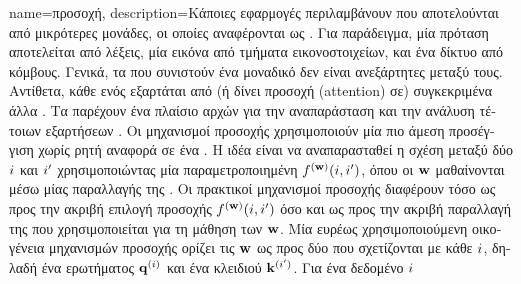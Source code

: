 {name={\foreignlanguage{greek}{προσοχή}}, 
	description={\foreignlanguage{greek}{Κάποιες εφαρμογές}  
		\foreignlanguage{greek}{περιλαμβάνουν}  \foreignlanguage{greek}{που αποτελούνται από μικρότερες
		μονάδες, οι οποίες αναφέρονται ως} . \foreignlanguage{greek}{Για παράδειγμα, μία πρόταση 
		αποτελείται από λέξεις, μία εικόνα από τμήματα εικονοστοιχείων, και ένα δίκτυο από κόμβους. Γενικά,
		τα}  \foreignlanguage{greek}{που συνιστούν ένα μοναδικό}  
		\foreignlanguage{greek}{δεν είναι ανεξάρτητες μεταξύ τους. Αντίθετα, κάθε}  
		\foreignlanguage{greek}{ενός}  \foreignlanguage{greek}{εξαρτάται από (ή δίνει προσοχή} 
		(attention) \foreignlanguage{greek}{σε) συγκεκριμένα άλλα} .
		\foreignlanguage{greek}{Τα}  \foreignlanguage{greek}{παρέχουν ένα πλαίσιο αρχών για την 
		αναπαράσταση και την ανάλυση τέτοιων εξαρτήσεων} \cite{Blei2003}. \foreignlanguage{greek}{Οι μηχανισμοί προσοχής 
		χρησιμοποι\-ούν μία πιο άμεση προσέγγιση χωρίς ρητή αναφορά σε ένα} . 
		\foreignlanguage{greek}{Η ιδέα είναι να αναπαρασταθεί η σχέση μεταξύ δύο}  $i$ 
		\foreignlanguage{greek}{και} $i'$ \foreignlanguage{greek}{χρησιμοποιώντας μία παραμετροποιημένη} 
		 $f^{({\bf w})}(i,i')$, \foreignlanguage{greek}{όπου οι}  
		${\bf w}$ \foreignlanguage{greek}{μαθαίνονται μέσω μίας 
		παραλλαγής της} . \foreignlanguage{greek}{Οι πρακτικοί μηχανισμοί προσοχής διαφέρουν τόσο ως προς
		την ακριβή επιλογή}  \foreignlanguage{greek}{προσοχής $f^{({\bf w})}(i,i')$ όσο και 
		ως προς την ακριβή παραλλαγή της}  \foreignlanguage{greek}{που χρησιμοποιείται για τη μάθηση των} 
		 ${\bf w}$. \foreignlanguage{greek}{Μία ευρέως χρησιμοποιούμενη οικογένεια μηχανισμών προσοχής
		ορίζει τις}  ${\bf w}$ \foreignlanguage{greek}{ως προς δύο}  
		\foreignlanguage{greek}{που σχετίζονται με κάθε}  $i$, \foreignlanguage{greek}{δηλαδή
		ένα}  \foreignlanguage{greek}{ερωτήματος ${\bf q}^{(i)}$ και ένα}  
		\foreignlanguage{greek}{κλειδιού ${\bf k}^{(i')}$. Για ένα δεδομένο}  $i$ 
}}
